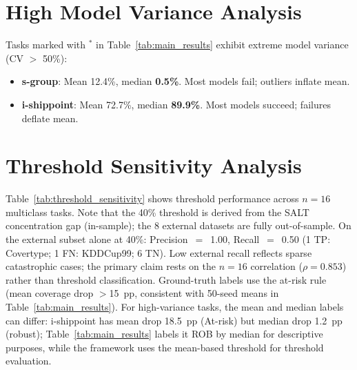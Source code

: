 \documentclass{uai2026} %
\begin{document}
\section{High Model Variance Analysis}\label{app:variance}

Tasks marked with $^*$ in Table~\ref{tab:main_results} exhibit extreme model variance (CV $>$ 50\%):
\begin{itemize}
    \item \textbf{s-group}: Mean 12.4\%, median \textbf{0.5\%}. Most models fail; outliers inflate mean.
    \item \textbf{i-shippoint}: Mean 72.7\%, median \textbf{89.9\%}. Most models succeed; failures deflate mean.
\end{itemize}

\section{Threshold Sensitivity Analysis}\label{app:threshold}

Table~\ref{tab:threshold_sensitivity} shows threshold performance across $n=16$ multiclass tasks. Note that the 40\% threshold is derived from the SALT concentration gap (in-sample); the 8 external datasets are fully out-of-sample. On the external subset alone at 40\%: Precision~$=$~1.00, Recall~$=$~0.50 (1 TP: Covertype; 1 FN: KDDCup99; 6 TN). Low external recall reflects sparse catastrophic cases; the primary claim rests on the $n=16$ correlation ($\rho=0.853$) rather than threshold classification. Ground-truth labels use the at-risk rule (mean coverage drop $>$15~pp, consistent with 50-seed means in Table~\ref{tab:main_results}). For high-variance tasks, the mean and median labels can differ: i-shippoint has mean drop 18.5~pp (At-risk) but median drop 1.2~pp (robust); Table~\ref{tab:main_results} labels it ROB by median for descriptive purposes, while the framework uses the mean-based threshold for threshold evaluation.
\end{document}
